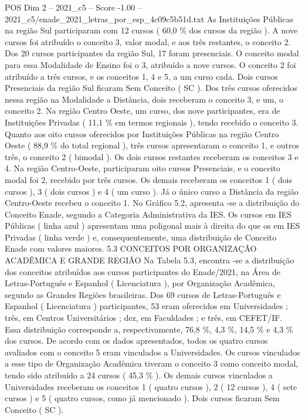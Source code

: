 \begin{textsample}{POS Dim 2 – 2021\_c5 – Score -1.00 – 2021\_c5/enade\_2021\_letras\_por\_esp\_4c09c5b51d.txt}
As Instituições Públicas na região Sul participaram com 12 cursos ( 60,0 \% dos cursos da região ).
A nove cursos foi atribuído o conceito 3, valor modal, e aos três restantes, o conceito 2.
Dos 20 cursos participantes da região Sul, 17 foram presenciais.
O conceito modal para essa Modalidade de Ensino foi o 3, atribuído a nove cursos.
O conceito 2 foi atribuído a três cursos, e os conceitos 1, 4 e 5, a um curso cada.
Dois cursos Presenciais da região Sul ficaram Sem Conceito ( SC ).
Dos três cursos oferecidos nessa região na Modalidade a Distância, dois receberam o conceito 3, e um, o conceito 2.
Na região Centro Oeste, um curso, dos nove participantes, era de Instituições Privadas ( 11,1 \% em termos regionais ), tendo recebido o conceito 3.
Quanto aos oito cursos oferecidos por Instituições Públicas na região Centro Oeste ( 88,9 \% do total regional ), três cursos apresentaram o conceito 1, e outros três, o conceito 2 ( bimodal ).
Os dois cursos restantes receberam os conceitos 3 e 4.
Na região Centro-Oeste, participaram oito cursos Presenciais, e o conceito modal foi 2, recebido por três cursos.
Os demais receberam os conceitos 1 ( dois cursos ), 3 ( dois cursos ) e 4 ( um curso ).
Já o único curso a Distância da região Centro-Oeste recebeu o conceito 1.
No Gráfico 5.2, apresenta -se a distribuição do Conceito Enade, segundo a Categoria Administrativa da IES.
Os cursos em IES Públicas ( linha azul ) apresentam uma poligonal mais à direita do que os em IES Privadas ( linha verde ) e, consequentemente, uma distribuição de Conceito Enade com valores maiores. 5.3 CONCEITOS POR ORGANIZAÇÃO ACADÊMICA E GRANDE REGIÃO Na Tabela 5.3, encontra -se a distribuição dos conceitos atribuídos aos cursos participantes do Enade/2021, na Área de Letras-Português e Espanhol ( Licenciatura ), por Organização Acadêmica, segundo as Grandes Regiões brasileiras.
Dos 69 cursos de Letras-Português e Espanhol ( Licenciatura ) participantes, 53 eram oferecidos em Universidades ; três, em Centros Universitários ; dez, em Faculdades ; e três, em CEFET/IF.
Essa distribuição corresponde a, respectivamente, 76,8 \%, 4,3 \%, 14,5 \% e 4,3 \% dos cursos.
De acordo com os dados apresentados, todos os quatro cursos avaliados com o conceito 5 eram vinculados a Universidades.
Os cursos vinculados a esse tipo de Organização Acadêmica tiveram o conceito 3 como conceito modal, tendo sido atribuído a 24 cursos ( 45,3 \% ).
Os demais cursos vinculados a Universidades receberam os conceitos 1 ( quatro cursos ), 2 ( 12 cursos ), 4 ( sete cursos ) e 5 ( quatro cursos, como já mencionado ).
Dois cursos ficaram Sem Conceito ( SC ).

\end{textsample}
